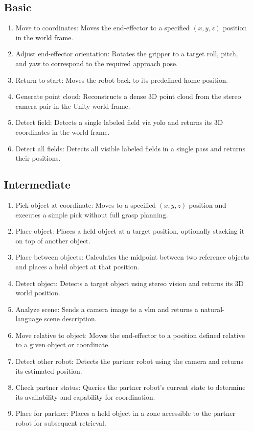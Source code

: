 \documentclass[
     12pt,
     a4paper,
     BCOR=10mm,
     DIV=14,
     listof=totoc,
     bibliography=totoc,
     parskip,
     twoside,
     headsepline
     ]{scrreprt}
\begin{document}
\subsection{Basic}
\begin{enumerate}
	\item Move to coordinates: Moves the end-effector to a specified $(x, y, z)$ position in the world frame.
	\item Adjust end-effector orientation: Rotates the gripper to a target roll, pitch, and yaw to correspond to the required approach pose.
	\item Return to start: Moves the robot back to its predefined home position.
	\item Generate point cloud: Reconstructs a dense 3D point cloud from the stereo camera pair in the Unity world frame.
	\item Detect field: Detects a single labeled field via \gls{yolo} and returns its 3D coordinates in the world frame.
	\item Detect all fields: Detects all visible labeled fields in a single pass and returns their positions.
\end{enumerate}

\subsection{Intermediate}
\begin{enumerate}
	\item Pick object at coordinate: Moves to a specified $(x, y, z)$ position and executes a simple pick without full grasp planning.
	\item Place object: Places a held object at a target position, optionally stacking it on top of another object.
	\item Place between objects: Calculates the midpoint between two reference objects and places a held object at that position.
	\item Detect object: Detects a target object using stereo vision and returns its 3D world position.
	\item Analyze scene: Sends a camera image to a \gls{vlm} and returns a natural-language scene description.
	\item Move relative to object: Moves the end-effector to a position defined relative to a given object or coordinate.
	\item Detect other robot: Detects the partner robot using the camera and returns its estimated position.
	\item Check partner status: Queries the partner robot's current state to determine its availability and capability for coordination.
	\item Place for partner: Places a held object in a zone accessible to the partner robot for subsequent retrieval.
\end{enumerate}
\end{document}
